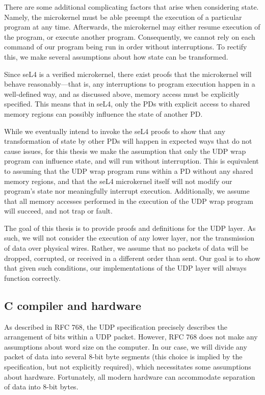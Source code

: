 \documentclass[twoside]{memoir}
\begin{document}
There are some additional complicating factors that arise when considering
state.
Namely, the microkernel must be able preempt the execution
of a particular program at any time.
Afterwards, the microkernel may either resume execution of the program,
or execute another program.
Consequently, we cannot rely on each command of our program
being run in order without interruptions.
To rectify this, we make several assumptions about how state can be transformed.

Since seL4 is a verified microkernel, there exist proofs that the microkernel
will behave reasonably---that is, any interruptions to program execution
happen in a well-defined way, and as discussed above, memory access must
be explicitly specified.
This means that in seL4, only the PDs with explicit access to
shared memory regions can possibly influence the state of another PD.

While we eventually intend to invoke the seL4 proofs to show that any
transformation of state by other PDs will happen in expected ways
that do not cause issues,
for this thesis we make the assumption that
only the UDP wrap program can influence state, and will run without interruption.
This is equivalent to assuming that the UDP wrap program runs within
a PD without any shared memory regions, and that the seL4 microkernel itself
will not modify our program's state nor meaningfully interrupt execution.
Additionally, we assume that all memory accesses performed in the execution of
the UDP wrap program will succeed, and not trap or fault.

The goal of this thesis is to provide proofs and definitions for the UDP
layer.
As such, we will not consider the execution of any lower layer, nor
the transmission of data over physical wires.
Rather, we assume that no packets of data will be dropped, corrupted, or received in
a different order than sent.
Our goal is to show that given such conditions,
our implementations of the UDP layer will always function correctly.

\subsection{C compiler and hardware}
As described in RFC 768, the UDP specification precisely describes
the arrangement of bits within a UDP packet.
However, RFC 768 does not make any assumptions about word size on the computer.
In our case, we will divide any packet of data into several 8-bit byte segments
(this choice is implied by the specification, but not explicitly required),
which necessitates some assumptions about hardware.
Fortunately, all modern hardware can accommodate separation of data
into 8-bit bytes.
\end{document}
